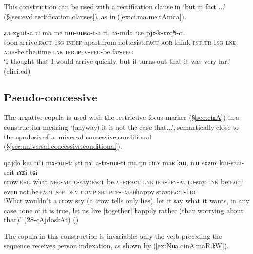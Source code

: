 This construction can be used with a rectification clause in   `but in fact ...' (§\ref{sec:evd.rectification.clauses}), as in (\ref{ex:ci.ma.me.tAmda}).

\begin{exe}
	\ex \label{ex:ci.ma.me.tAmda}
	\gll ʑa zɣɯt-a ci ma me nɯ-sɯso-t-a ri, tɤ-mda tɕe pjɤ-k-ɤrqʰi-ci. \\
	soon arrive:\textsc{fact}-\textsc{1sg} \textsc{indef} apart.from not.exist:\textsc{fact} \textsc{aor}-think-\textsc{pst}:\textsc{tr}-\textsc{1sg} \textsc{lnk} 
	\textsc{aor}-be.the.time \textsc{lnk}  \textsc{ifr}.\textsc{ipfv}-\textsc{peg}-be.far-\textsc{peg} \\
	\glt `I thought that I would arrive quickly, but it turns out that it was very far.' (elicited)
\end{exe}

\subsection{Pseudo-concessive} \label{sec:cinAmaRkW}
The negative copula  is used with the restrictive focus marker  (§\ref{sec:cinA}) in a construction meaning `(anyway) it is not the case that...', semantically close to the apodosis of a universal concessive conditional (§\ref{sec:universal.concessive.conditional}).


\begin{exe}
	\ex \label{ex:Nu.cinA.maR.kW}
	\gll qajdo kɯ tɕʰi mɤ-nɯ-ti ɕti nɤ, a-tɤ-nɯ-ti ma ŋu cinɤ maʁ kɯ, nɯ sɤznɤ kɯ-scɯ-scit rɤʑi-tɕi \\
	crow \textsc{erg} what \textsc{neg}-\textsc{auto}-say:\textsc{fact} be.\textsc{aff}:\textsc{fact} \textsc{lnk} \textsc{irr}-\textsc{pfv}-\textsc{auto}-say \textsc{lnk} be:\textsc{fact} even not.be:\textsc{fact} \textsc{sfp} \textsc{dem} \textsc{comp} \textsc{sbj}:\textsc{pcp}-\textsc{emph}\redp{}happy stay:\textsc{fact}-\textsc{1du} \\
	\glt `What wouldn't a crow say (a crow tells only lies), let it say what it wants, in any case none of it is true, let us live [together] happily rather (than worrying about that).' (28-qAjdoskAt)
()
\end{exe} 

The copula  in this construction is invariable: only the verb preceding the  sequence receives person indexation, as shown by (\ref{ex:Nua.cinA.maR.kW}).  

